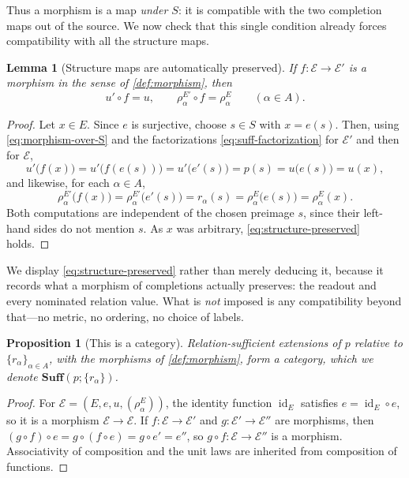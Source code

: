 \documentclass[11pt,reqno]{amsart}
\theoremstyle{plain}
\newtheorem{proposition}[theorem]{Proposition}
\newtheorem{lemma}[theorem]{Lemma}
\theoremstyle{definition}
\theoremstyle{remark}
\numberwithin{equation}{section}
\DeclareMathOperator{\id}{id}
\begin{document}
Thus a morphism is a map \emph{under $S$}: it is compatible with the two completion maps out of the
source. We now check that this single condition already forces compatibility with all the structure
maps.

\begin{lemma}[Structure maps are automatically preserved]
\label{lem:structure-preserved}
If $f\colon\mathcal E\to\mathcal E'$ is a morphism in the sense of \cref{def:morphism}, then
\begin{equation}
\label{eq:structure-preserved}
u'\circ f=u,
\qquad
\rho_\alpha^{E'}\circ f=\rho_\alpha^E
\qquad(\alpha\in A).
\end{equation}
\end{lemma}

\begin{proof}
Let $x\in E$. Since $e$ is surjective, choose $s\in S$ with $x=e(s)$. Then, using
\eqref{eq:morphism-over-S} and the factorizations \eqref{eq:suff-factorization} for $\mathcal E'$
and then for $\mathcal E$,
\[
u'\bigl(f(x)\bigr)=u'\bigl(f(e(s))\bigr)=u'\bigl(e'(s)\bigr)=p(s)=u\bigl(e(s)\bigr)=u(x),
\]
and likewise, for each $\alpha\in A$,
\[
\rho_\alpha^{E'}\bigl(f(x)\bigr)
=\rho_\alpha^{E'}\bigl(e'(s)\bigr)
=r_\alpha(s)
=\rho_\alpha^{E}\bigl(e(s)\bigr)
=\rho_\alpha^{E}(x).
\]
Both computations are independent of the chosen preimage $s$, since their left-hand sides do not
mention $s$. As $x$ was arbitrary, \eqref{eq:structure-preserved} holds.
\end{proof}

We display \eqref{eq:structure-preserved} rather than merely deducing it, because it records what a
morphism of completions actually preserves: the readout and every nominated relation value. What is
\emph{not} imposed is any compatibility beyond that---no metric, no ordering, no choice of labels.

\begin{proposition}[This is a category]
\label{prop:category}
Relation-sufficient extensions of $p$ relative to $\{r_\alpha\}_{\alpha\in A}$, with the morphisms of
\cref{def:morphism}, form a category, which we denote $\mathbf{Suff}(p;\{r_\alpha\})$.
\end{proposition}

\begin{proof}
For $\mathcal E=(E,e,u,(\rho_\alpha^E))$, the identity function $\id_E$ satisfies $e=\id_E\circ e$,
so it is a morphism $\mathcal E\to\mathcal E$. If $f\colon\mathcal E\to\mathcal E'$ and
$g\colon\mathcal E'\to\mathcal E''$ are morphisms, then
$(g\circ f)\circ e=g\circ(f\circ e)=g\circ e'=e''$, so $g\circ f\colon\mathcal E\to\mathcal E''$ is a
morphism. Associativity of composition and the unit laws are inherited from composition of functions.
\end{proof}
\end{document}
